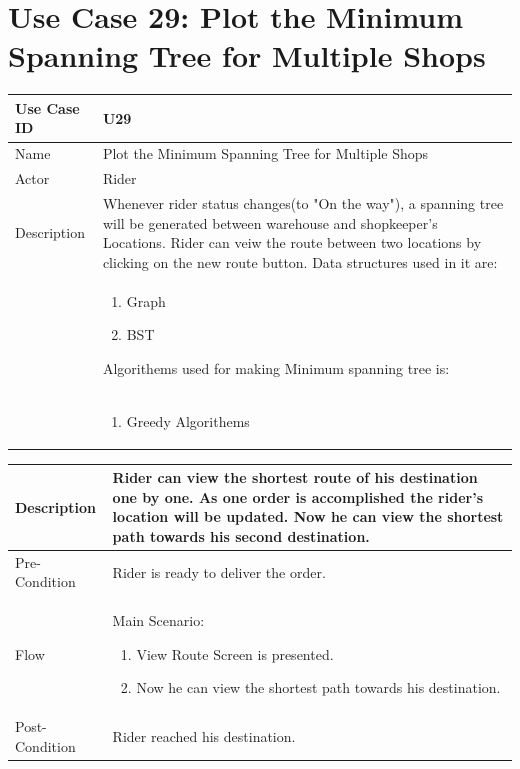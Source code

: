 \documentclass[12pt,a4paper]{report}
\begin{document}
\section{Use Case 29: Plot the Minimum Spanning Tree for Multiple Shops}

\begin{tabular}{ | m{3cm} | m{12cm}| } \hline
Use Case ID &  U29 \\\hline

Name  	    &  Plot the Minimum Spanning Tree for Multiple Shops \\ \hline

Actor     	& Rider \\ \hline

Description &     Whenever rider status changes(to "On the way"), a spanning tree will be  generated between warehouse and shopkeeper's Locations. Rider can veiw the route between two locations by clicking on the new route button.
 Data structures used in it are:\\
&\begin{enumerate}
   \item Graph
   \item BST 
\end{enumerate}
Algorithems used for making Minimum spanning tree is: \\
&\begin{enumerate}
   \item Greedy Algorithems
\end{enumerate}\\ \hline
\end{tabular}
\begin{tabular}{ | m{3cm} | m{12cm}| } \hline
Description & Rider can view the shortest route of his destination one by one. As one order is accomplished the rider's location will be updated. Now he can view the shortest path towards his second destination.
\\
\hline

Pre-Condition &  Rider is ready to deliver the order.  \\ \hline

Flow & Main Scenario:

\begin{enumerate}
\item View Route Screen is presented.
\item Now he can view the shortest path towards his destination.
\end{enumerate}

\\ \hline

Post-Condition &  Rider reached his destination. \\ \hline

\end{tabular}
\end{document}
